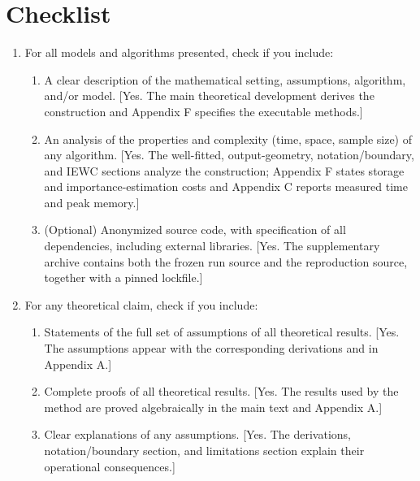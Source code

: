 \section*{Checklist}

\begin{enumerate}
  \item For all models and algorithms presented, check if you include:
  \begin{enumerate}
    \item A clear description of the mathematical setting, assumptions,
    algorithm, and/or model. [Yes. The main theoretical development derives the construction and
    Appendix F specifies the executable methods.]
    \item An analysis of the properties and complexity (time, space, sample
    size) of any algorithm. [Yes. The well-fitted, output-geometry,
    notation/boundary, and IEWC sections analyze the construction;
    Appendix F states storage and importance-estimation costs and Appendix C
    reports measured time and peak memory.]
    \item (Optional) Anonymized source code, with specification of all
    dependencies, including external libraries. [Yes. The supplementary
    archive contains both the frozen run source and the reproduction source,
    together with a pinned lockfile.]
  \end{enumerate}

  \item For any theoretical claim, check if you include:
  \begin{enumerate}
    \item Statements of the full set of assumptions of all theoretical results.
    [Yes. The assumptions appear with the corresponding derivations and in
    Appendix A.]
    \item Complete proofs of all theoretical results. [Yes. The results used by
    the method are proved algebraically in the main text and Appendix A.]
    \item Clear explanations of any assumptions. [Yes. The derivations,
    notation/boundary section, and limitations section explain their operational
    consequences.]
  \end{enumerate}


\end{enumerate}
